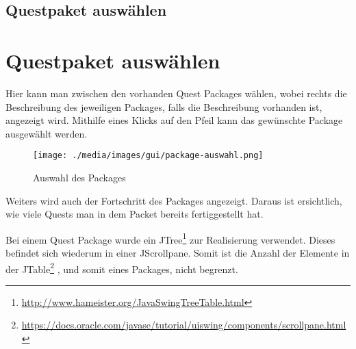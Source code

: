 \iffabian
	\subsection{Questpaket auswählen}
	\label{sec:gui-elements-package-sel}
\else
	\section{Questpaket auswählen}
	\label{sec:gui-elements-package-sel}
\fi
Hier kann man zwischen den vorhanden Quest Packages wählen, wobei rechts die Beschreibung des jeweiligen Packages, falls die Beschreibung vorhanden ist, angezeigt wird. Mithilfe eines Klicks auf den Pfeil kann das gewünschte Package ausgewählt werden.

\begin{figure}[h] 
  \centering
     \texttt{[image: ./media/images/gui/package-auswahl.png]}
  \caption{Auswahl des Packages}
  \label{fig:Package_Auswahl}
\end{figure}

Weiters wird auch der Fortschritt des Packages angezeigt. Daraus ist ersichtlich, wie viele Quests man in dem Packet bereits fertiggestellt hat.

Bei einem Quest Package wurde ein JTree\footnote{\url{http://www.hameister.org/JavaSwingTreeTable.html}}  zur Realisierung verwendet. Dieses befindet sich wiederum in einer JScrollpane. Somit ist die Anzahl der Elemente in der JTable\footnote{\url{https://docs.oracle.com/javase/tutorial/uiswing/components/scrollpane.html}}  , und somit eines Packages, nicht begrenzt.
